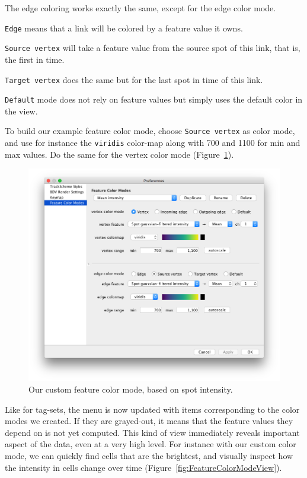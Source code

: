The edge coloring works exactly the same, except for the edge color mode.
\begin{myitemize}
    \item \texttt{Edge} means that a link will be colored by a feature value it owns.
    \item \texttt{Source vertex} will take a feature value from the source spot of this link, that is, the first in time.
    \item \texttt{Target vertex} does the same but for the last spot in time of this link. 
    \item \texttt{Default} mode does not rely on feature values but simply uses the default color in the view.
\end{myitemize}
\noindent To build our example feature color mode, choose \texttt{Source vertex} as color mode, and use for instance the \texttt{viridis} color-map along with 700 and 1100 for min and max values.
Do the same for the vertex color mode (Figure~\ref{fig:FeatureColorModeConfig2}).


\begin{figure}
    \centering
    \includegraphics[height=0.3\textheight]{figures/Mastodon_FeatureColorModeConfig_2.png}
    
    \caption{Our custom feature color mode, based on spot intensity. }
    \label{fig:FeatureColorModeConfig2}
\end{figure}

Like for tag-sets, the  menu is now updated with items corresponding to the color modes we created.
If they are grayed-out, it means that the feature values they depend on is not yet computed.
This kind of view immediately reveals important aspect of the data, even at a very high level.
For instance with our custom color mode, we can quickly find cells that are the brightest, and visually inspect how the intensity in cells change over time (Figure~\ref{fig:FeatureColorModeView}).

